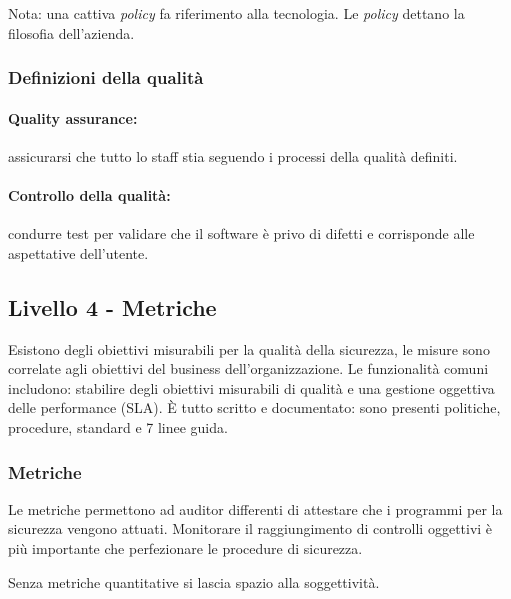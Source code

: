 Nota: una cattiva \textit{policy} fa riferimento alla tecnologia. Le
\textit{policy} dettano la filosofia dell'azienda.



\subsubsection{Definizioni della qualità}

\paragraph*{Quality assurance:} assicurarsi che tutto lo staff stia seguendo i
processi della qualità definiti.

\paragraph*{Controllo della qualità:} condurre test per validare che il
software è privo di difetti e corrisponde alle aspettative dell'utente.

\subsection{Livello 4 - Metriche}

Esistono degli obiettivi misurabili per la qualità della sicurezza, le misure
sono correlate agli obiettivi del business dell'organizzazione. Le
funzionalità comuni includono: stabilire degli obiettivi misurabili di qualità
e una gestione oggettiva delle performance (SLA).
È tutto scritto e documentato: sono presenti politiche, procedure, standard e 7
linee guida.

\subsubsection{Metriche}

Le metriche permettono ad auditor differenti di attestare che i programmi per
la sicurezza vengono attuati. Monitorare il raggiungimento di controlli
oggettivi è più importante che perfezionare le procedure di sicurezza.

Senza metriche quantitative si lascia spazio alla soggettività.

